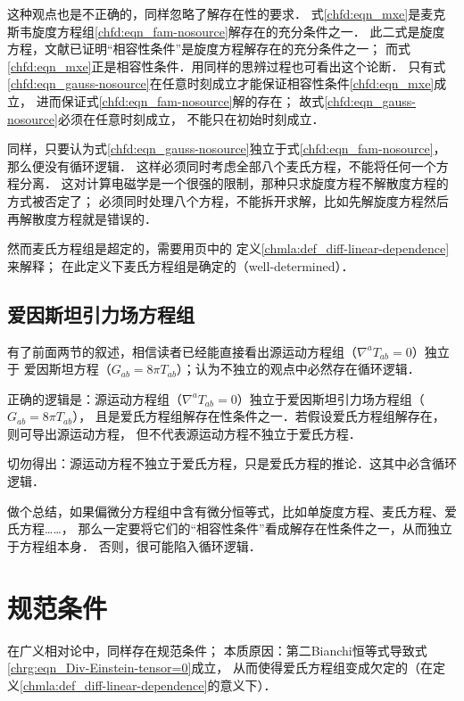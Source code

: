 这种观点也是不正确的，同样忽略了解存在性的要求．
式\eqref{chfd:eqn_mxe}是麦克斯韦旋度方程组\eqref{chfd:eqn_fam-nosource}解存在的充分条件之一．
此二式是旋度方程，文献\parencite{aramaki-2014}已证明“相容性条件”是旋度方程解存在的充分条件之一；
而式\eqref{chfd:eqn_mxe}正是相容性条件．用同样的思辨过程也可看出这个论断．
只有式\eqref{chfd:eqn_gauss-nosource}在任意时刻成立才能保证相容性条件\eqref{chfd:eqn_mxe}成立，
进而保证式\eqref{chfd:eqn_fam-nosource}解的存在；
故式\eqref{chfd:eqn_gauss-nosource}必须在任意时刻成立，
不能只在初始时刻成立．


同样，只要认为式\eqref{chfd:eqn_gauss-nosource}独立于式\eqref{chfd:eqn_fam-nosource}，那么便没有循环逻辑．
这样必须同时考虑全部八个麦氏方程，不能将任何一个方程分离．
这对计算电磁学是一个很强的限制，那种只求旋度方程不解散度方程的方式被否定了；
必须同时处理八个方程，不能拆开求解，比如先解旋度方程然后再解散度方程就是错误的．


然而麦氏方程组是超定的，需要用\pageref{chmla:def_diff-linear-dependence}页中的
定义\ref{chmla:def_diff-linear-dependence}来解释；
在此定义下麦氏方程组是确定的（well-determined）．

\subsection{爱因斯坦引力场方程组}
有了前面两节的叙述，相信读者已经能直接看出源运动方程组（$\nabla^a T_{ab}=0$）独立于
爱因斯坦方程（$G_{ab}=8\pi T_{ab}$）；认为不独立的观点中必然存在循环逻辑．

正确的逻辑是：源运动方程组（$\nabla^a T_{ab}=0$）独立于爱因斯坦引力场方程组（$G_{ab}=8\pi T_{ab}$），
且是爱氏方程组解存在性条件之一．若假设爱氏方程组解存在，则可导出源运动方程，
但不代表源运动方程不独立于爱氏方程．

切勿得出：源运动方程不独立于爱氏方程，只是爱氏方程的推论．这其中必含循环逻辑．

做个总结，如果偏微分方程组中含有微分恒等式，比如单旋度方程、麦氏方程、爱氏方程……，
那么一定要将它们的“相容性条件”看成解存在性条件之一，从而独立于方程组本身．
否则，很可能陷入循环逻辑．




\section{规范条件}
在广义相对论中，同样存在规范条件；
本质原因：第二Bianchi恒等式导致式\eqref{chrg:eqn_Div-Einstein-tensor=0}成立，
从而使得爱氏方程组变成欠定的（在定义\ref{chmla:def_diff-linear-dependence}的意义下）．

